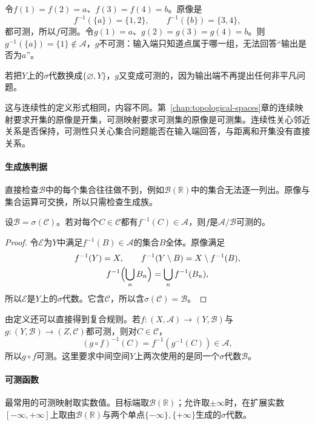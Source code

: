 令$f(1)=f(2)=a$、$f(3)=f(4)=b$。原像是
\[
 f^{-1}(\{a\})=\{1,2\},\qquad f^{-1}(\{b\})=\{3,4\},
\]
都可测，所以$f$可测。令$g(1)=a$、$g(2)=g(3)=g(4)=b$。则$g^{-1}(\{a\})=\{1\}\notin\mathcal A$，$g$不可测：输入端只知道点属于哪一组，无法回答“输出是否为$a$”。

若把$Y$上的$\sigma$代数换成$\{\varnothing,Y\}$，$g$又变成可测的，因为输出端不再提出任何非平凡问题。

这与连续性的定义形式相同，内容不同。第~\ref{chap:topological-spaces}章的连续映射要求开集的原像是开集，可测映射要求可测集的原像是可测集。连续性关心邻近关系是否保持，可测性只关心集合问题能否在输入端回答，与距离和开集没有直接关系。

\paragraph{生成族判据}
直接检查$\mathcal B$中的每个集合往往做不到，例如$\mathcal B(\mathbb R)$中的集合无法逐一列出。原像与集合运算可交换，所以只需检查生成族。

\begin{lemma}[生成族判据]
\label{lem:meas-generator-criterion}
设$\mathcal B=\sigma(\mathcal C)$。若对每个$C\in\mathcal C$都有$f^{-1}(C)\in\mathcal A$，则$f$是$\mathcal A/\mathcal B$可测的。
\end{lemma}

\begin{proof}
令$\mathcal E$为$Y$中满足$f^{-1}(B)\in\mathcal A$的集合$B$全体。原像满足
\[
\begin{gathered}
 f^{-1}(Y)=X,\qquad f^{-1}(Y\setminus B)=X\setminus f^{-1}(B),\\
 f^{-1}\Bigl(\bigcup_nB_n\Bigr)=\bigcup_nf^{-1}(B_n),
\end{gathered}
\]
所以$\mathcal E$是$Y$上的$\sigma$代数。它含$\mathcal C$，所以含$\sigma(\mathcal C)=\mathcal B$。
\end{proof}

由定义还可以直接得到复合规则。若$f:(X,\mathcal A)\to(Y,\mathcal B)$与$g:(Y,\mathcal B)\to(Z,\mathcal C)$都可测，则对$C\in\mathcal C$，
\[
 (g\circ f)^{-1}(C)=f^{-1}(g^{-1}(C))\in\mathcal A,
\]
所以$g\circ f$可测。这里要求中间空间$Y$上两次使用的是同一个$\sigma$代数$\mathcal B$。

\paragraph{可测函数}
最常用的可测映射取实数值。目标端取$\mathcal B(\mathbb R)$；允许取$\pm\infty$时，在扩展实数$[-\infty,+\infty]$上取由$\mathcal B(\mathbb R)$与两个单点$\{-\infty\},\{+\infty\}$生成的$\sigma$代数。

